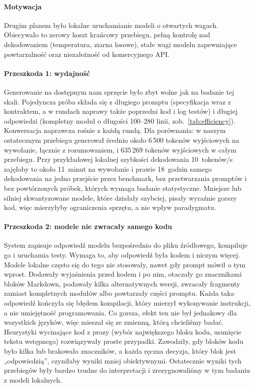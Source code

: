 \paragraph{Motywacja} Drugim planem było lokalne uruchamianie modeli o otwartych wagach. Obiecywało
to zerowy koszt krańcowy przebiegu, pełną kontrolę nad dekodowaniem (temperatura, ziarna losowe),
stałe wagi modelu zapewniające powtarzalność oraz niezależność od komercyjnego API.

\paragraph{Przeszkoda 1: wydajność} Generowanie na dostępnym nam sprzęcie było zbyt wolne jak na
badanie tej skali. Pojedyncza próba składa się z długiego promptu (specyfikacja wraz z kontraktem,
a w rundach naprawy także poprzedni kod i log testów) i długiej odpowiedzi (kompletny moduł
o długości 100--280 linii, zob.\ \cref{tab:efficiency}). Konwersacja naprawcza rośnie z każdą
rundą. Dla porównania: w naszym ostatecznym przebiegu \haiku{} generował średnio około 6\,500
tokenów wyjściowych na wywołanie, łącznie z rozumowaniem, i 635\,269 tokenów wyjściowych w całym
przebiegu. Przy przykładowej lokalnej szybkości dekodowania 10~tokenów/s zajęłoby to około
11~minut na wywołanie i prawie 18~godzin samego dekodowania na jedno przejście przez benchmark, bez
przetwarzania promptów i bez powtórzonych próbek, których wymaga badanie statystyczne. Mniejsze lub
silniej skwantyzowane modele, które działały szybciej, pisały wyraźnie gorszy kod, więc mierzyłyby
ograniczenia sprzętu, a nie wpływ paradygmatu.

\paragraph{Przeszkoda 2: modele nie zwracały samego kodu} System zapisuje odpowiedź modelu
bezpośrednio do pliku źródłowego, kompiluje go i uruchamia testy. Wymaga to, aby odpowiedź była
kodem i niczym więcej. Modele lokalne często się do tego nie stosowały, nawet gdy prompt mówił o tym
wprost. Dodawały wyjaśnienia przed kodem i po nim, otaczały go znacznikami bloków Markdown, podawały
kilka alternatywnych wersji, zwracały fragmenty zamiast kompletnych modułów albo powtarzały części
promptu. Każda taka odpowiedź kończyła się błędem kompilacji, który mierzył wykonywanie instrukcji,
a nie umiejętność programowania. Co gorsza, efekt ten nie był jednakowy dla wszystkich języków,
więc mieszał się ze zmienną, którą chcieliśmy badać. Heurystyki wycinające kod z prozy (wybór
największego bloku kodu, usunięcie tekstu wstępnego) rozwiązywały proste przypadki. Zawodziły,
gdy bloków kodu było kilka lub brakowało znaczników, a każda ręczna decyzja, który blok jest
„odpowiedzią”, czyniłaby wyniki mniej obiektywnymi. Ostatecznie wyniki tych przebiegów były bardzo
trudne do interpretacji i zrezygnowaliśmy w tym badaniu z modeli lokalnych.

